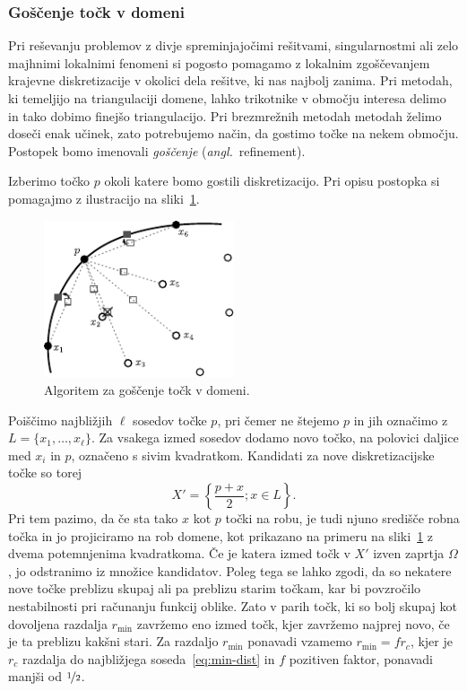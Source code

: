 \documentclass[12pt,a4paper,twoside]{article}
\theoremstyle{definition} %
\theoremstyle{plain} %
\numberwithin{equation}{section}
\newcommand{\ang}[1]{(\textit{angl.}\ #1)}
\begin{document}
\subsubsection{Goščenje točk v domeni}
\label{sec:goscenje}
Pri reševanju problemov z divje spreminjajočimi rešitvami, singularnostmi ali zelo majhnimi
lokalnimi fenomeni si pogosto pomagamo z lokalnim zgoščevanjem krajevne diskretizacije v okolici
dela rešitve, ki nas najbolj zanima. Pri metodah, ki temeljijo na triangulaciji domene, lahko
trikotnike v območju interesa delimo in tako dobimo finejšo triangulacijo. Pri brezmrežnih metodah
metodah želimo doseči enak učinek, zato potrebujemo način, da gostimo točke na nekem območju.
Postopek bomo imenovali \emph{goščenje} \ang{refinement}.

Izberimo točko $p$ okoli katere bomo gostili diskretizacijo. Pri opisu postopka si pomagajmo z
ilustracijo na sliki~\ref{fig:refine-algorithm}.
\begin{figure}[h]
  \centering
  \includegraphics[width=0.5\textwidth]{images/domain_refine.pdf}
  \caption{Algoritem za goščenje točk v domeni.}
  \label{fig:refine-algorithm}
\end{figure}
Poiščimo najbližjih $\ell$ sosedov točke $p$, pri čemer ne štejemo $p$ in jih označimo z $L = \{x_1,
\dots, x_\ell\}$.  Za vsakega izmed sosedov dodamo novo točko, na polovici daljice med $x_i$ in $p$,
označeno s sivim kvadratkom. Kandidati za nove diskretizacijske točke so torej
\begin{equation}
   X' = \left\{ \frac{p+x}{2}; x \in L \right\}.
\end{equation}
Pri tem pazimo, da če sta tako $x$ kot $p$ točki na robu, je tudi njuno središče robna točka in jo
projiciramo na rob domene, kot prikazano na primeru na sliki~\ref{fig:refine-algorithm} z dvema
potemnjenima kvadratkoma. Če je katera izmed točk v $X'$ izven zaprtja $\Omega$, jo odstranimo iz
množice kandidatov. Poleg tega se lahko zgodi, da so nekatere nove točke preblizu skupaj ali pa
preblizu starim točkam, kar bi povzročilo nestabilnosti pri računanju funkcij oblike. Zato v parih
točk, ki so bolj skupaj kot dovoljena razdalja $r_{\text{min}}$ zavržemo eno izmed točk, kjer
zavržemo najprej novo, če je ta preblizu kakšni stari. Za razdaljo $r_\text{min}$ ponavadi vzamemo
$r_\text{min} = f r_c$, kjer je $r_c$ razdalja do najbližjega soseda~\eqref{eq:min-dist} in $f$
pozitiven faktor, ponavadi manjši od $\nicefrac{1}{2}$.
\end{document}

